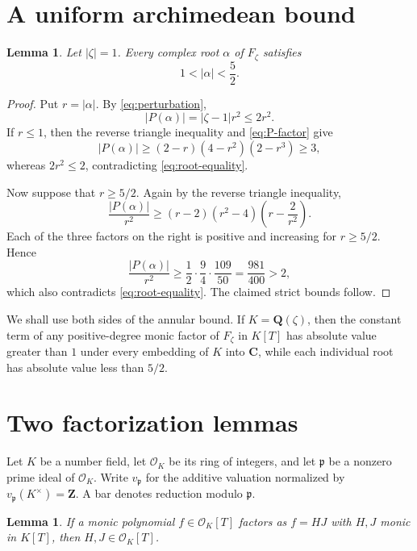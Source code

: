 \documentclass[11pt]{article}
\newtheorem{lemma}[theorem]{Lemma}
\newcommand{\Q}{\mathbf Q}
\newcommand{\Z}{\mathbf Z}
\newcommand{\C}{\mathbf C}
\newcommand{\OK}{\mathcal O_K}
\begin{document}
\section{A uniform archimedean bound}

\begin{lemma}\label{lem:annulus}
Let $|\zeta|=1$.  Every complex root $\alpha$ of $F_\zeta$ satisfies
\[
 1<|\alpha|<\frac52.
\]
\end{lemma}

\begin{proof}
Put $r=|\alpha|$.  By \eqref{eq:perturbation},
\begin{equation}\label{eq:root-equality}
 |P(\alpha)|=|\zeta-1|r^2\leq2r^2.
\end{equation}
If $r\leq1$, then the reverse triangle inequality and
\eqref{eq:P-factor} give
\[
 |P(\alpha)|
 \geq(2-r)(4-r^2)(2-r^3)
 \geq3,
\]
whereas $2r^2\leq2$, contradicting \eqref{eq:root-equality}.

Now suppose that $r\geq5/2$.  Again by the reverse triangle inequality,
\[
 \frac{|P(\alpha)|}{r^2}
 \geq(r-2)(r^2-4)\left(r-\frac{2}{r^2}\right).
\]
Each of the three factors on the right is positive and increasing for
$r\geq5/2$.  Hence
\[
 \frac{|P(\alpha)|}{r^2}
 \geq\frac12\cdot\frac94\cdot\frac{109}{50}
 =\frac{981}{400}>2,
\]
which also contradicts \eqref{eq:root-equality}.  The claimed strict
bounds follow.
\end{proof}

We shall use both sides of the annular bound.  If
$K=\Q(\zeta)$, then the constant term of any positive-degree monic
factor of $F_\zeta$ in $K[T]$ has absolute value greater than $1$ under
every embedding of $K$ into $\C$, while each individual root has
absolute value less than $5/2$.

\section{Two factorization lemmas}

Let $K$ be a number field, let $\OK$ be its ring of integers, and let
$\mathfrak p$ be a nonzero prime ideal of $\OK$.  Write
$v_{\mathfrak p}$ for the additive valuation normalized by
$v_{\mathfrak p}(K^\times)=\Z$.  A bar denotes reduction modulo
$\mathfrak p$.

\begin{lemma}\label{lem:integral-factors}
If a monic polynomial $f\in\OK[T]$ factors as $f=HJ$ with $H,J$ monic
in $K[T]$, then $H,J\in\OK[T]$.
\end{lemma}
\end{document}
